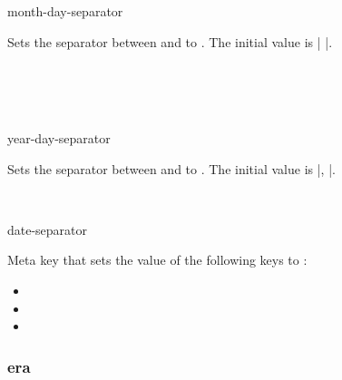 \documentclass{beerydoc}
\begin{document}
\begin{codedoc}{month-day-separator}
  \begin{syntax}
  \end{syntax}
  Sets the separator between  and  to .
  The initial value is | |.
  \begin{codedemo}
    \\
    \\
    \\
  \end{codedemo}
\end{codedoc}

\begin{codedoc}{year-day-separator}
  \begin{syntax}
  \end{syntax}
  Sets the separator between  and  to .
  The initial value is |, |.
  \begin{codedemo}
    \\
  \end{codedemo}
\end{codedoc}

\begin{codedoc}{date-separator}
  \begin{syntax}
  \end{syntax}
  Meta key that sets the value of the following keys to :
  \begin{itemize}
    \item {}
    \item {}
    \item {}
  \end{itemize}
\end{codedoc}

\subsubsection{era}
\label{subsubsec:era}
\end{document}
